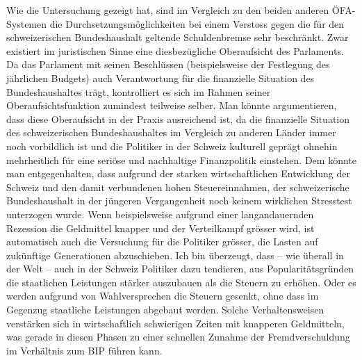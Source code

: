\documentclass[10pt]{article}
\begin{document}
Wie die Untersuchung gezeigt hat, sind im Vergleich zu den beiden anderen ÖFA-Systemen die Durchsetzungsmöglichkeiten bei einem Verstoss gegen die für den schweizerischen Bundeshaushalt geltende Schuldenbremse sehr beschränkt. Zwar existiert im juristischen Sinne eine diesbezügliche Oberaufsicht des Parlaments. Da das Parlament mit seinen Beschlüssen (beispielsweise der Festlegung des jährlichen Budgets) auch Verantwortung für die finanzielle Situation des Bundeshaushaltes trägt, kontrolliert es sich im Rahmen seiner Oberaufsichtsfunktion zumindest teilweise selber. Man könnte argumentieren, dass diese Oberaufsicht in der Praxis ausreichend ist, da die finanzielle Situation des schweizerischen Bundeshaushaltes im Vergleich zu anderen Länder immer noch vorbildlich ist und die Politiker in der Schweiz kulturell geprägt ohnehin mehrheitlich für eine seriöse und nachhaltige Finanzpolitik einstehen. Dem könnte man entgegenhalten, dass aufgrund der starken wirtschaftlichen Entwicklung der Schweiz und den damit verbundenen hohen Steuereinnahmen, der schweizerische Bundeshaushalt in der jüngeren Vergangenheit noch keinem wirklichen Stresstest unterzogen wurde. Wenn beispielsweise aufgrund einer langandauernden Rezession die Geldmittel knapper und der Verteilkampf grösser wird, ist automatisch auch die Versuchung für die Politiker grösser, die Lasten auf zukünftige Generationen abzuschieben. Ich bin überzeugt, dass -- wie überall in der Welt -- auch in der Schweiz Politiker dazu tendieren, aus Popularitätsgründen die staatlichen Leistungen stärker auszubauen als die Steuern zu erhöhen. Oder es werden aufgrund von Wahlversprechen die Steuern gesenkt, ohne dass im Gegenzug staatliche Leistungen abgebaut werden. Solche Verhaltensweisen verstärken sich in wirtschaftlich schwierigen Zeiten mit knapperen Geldmitteln, was gerade in diesen Phasen zu einer schnellen Zunahme der Fremdverschuldung im Verhältnis zum BIP führen kann.
\end{document}
